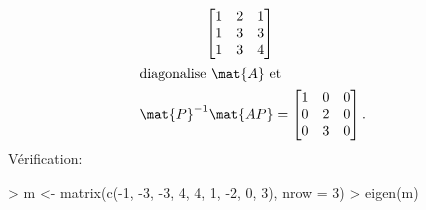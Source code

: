 \begin{exercice}
\begin{sol}
\begin{enumerate}
\begin{align*}
\begin{bmatrix}
          1 & 2 & 1 \\ 1 & 3 & 3 \\ 1 & 3 & 4
        \end{bmatrix} \\
        \intertext{diagonalise $\mat{A}$ et}
        \mat{P}^{-1} \mat{AP}
        &=
        \begin{bmatrix}
          1 & 0 & 0 \\ 0 & 2 & 0 \\ 0 & 3 & 0
        \end{bmatrix}.
      \end{align*}
      Vérification:
\begin{Schunk}
\begin{Sinput}
> m <- matrix(c(-1, -3, -3, 4, 4, 1, -2, 0, 3), nrow = 3)
> eigen(m)
\end{Sinput}
\end{Schunk}
\end{enumerate}
\end{sol}
\end{exercice}
